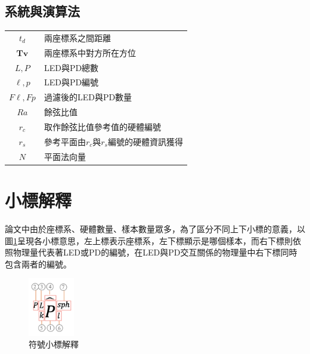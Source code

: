 \onehalfspacing

\subsection*{系統與演算法}

\begin{longtable}[l]{cl}
    $t_d$ & 兩座標系之間距離\\
    $\boldsymbol{Tv}$ & 兩座標系中對方所在方位\\
    $L,P$ & LED與PD總數\\
    $\ell,p$ & LED與PD編號\\
    $F\ell,Fp$ & 過濾後的LED與PD數量\\
    $Ra$& 餘弦比值\\
    $r_c$& 取作餘弦比值參考值的硬體編號\\
    $r_s$& 參考平面由$r_c$與$r_s$編號的硬體資訊獲得\\
    $N$& 平面法向量\\

\end{longtable}




\onehalfspacing

\section*{小標解釋}

論文中由於座標系、硬體數量、樣本數量眾多，為了區分不同上下小標的意義，以圖\ref{pic:symbol}呈現各小標意思，左上標表示座標系，左下標顯示是哪個樣本，而右下標則依照物理量代表著LED或PD的編號，在LED與PD交互關係的物理量中右下標同時包含兩者的編號。

\begin{figure}[ht]
	\centering
	\includegraphics[width=2cm]{ch1pic/not_whole.png}
    \caption{符號小標解釋}
    \label{pic:symbol}
\end{figure}



